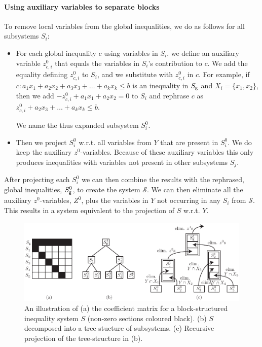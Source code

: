 \paragraph{Using auxiliary variables to separate blocks}  
To remove local variables from the global inequalities, we do as follows for all subsystems $S_i$:
\begin{itemize}\itemsep0em
\item For each global inequality $c$ using variables in $S_i$, we define an auxiliary variable $z^0_{c,i}$ that equals the variables in $S_i$'s contribution to $c$. We add the equality defining $z^0_{c,i}$ to $S_i$, and we substitute with $z^0_{c,i}$ in $c$. For example, if $c: a_1x_1 + a_2x_2 + a_3x_3 + \ldots + a_kx_k \leq b$ is an inequality in $S_{\texttt{g}}$ and $X_i = \{x_1,x_2\}$, then we add $-z^0_{c,i} + a_1x_1 + a_2x_2 = 0$ to $S_i$ and rephrase $c$ as $z^0_{c,i} + a_2x_3 + \ldots + a_kx_k \leq b$. 

We name the thus expanded subsystem $S_i^0$. 
\item Then we project $S_i^0$ w.r.t. all variables from $Y$ that are present in $S_i^0$. We do keep the auxiliary $z^0$-variables. 
Because of these auxiliary variables this only produces inequalities with variables not present in other subsystems $S_j$. 
\end{itemize}
After projecting each $S_i^0$ we can then combine the results with the rephrased, global inequalities, $S_{\texttt{g}}^0$, to create the system $\mathcal{S}$. We can then eliminate all the auxiliary $z^0$-variables, $Z^0$, plus the variables in $Y$ not occurring in any $S_i$ from $\mathcal{S}$. This results in a system equivalent to the projection of $S$ w.r.t. $Y$. %

\begin{figure}
	\centering
		\includegraphics{figures/recursiveProjectionEs.pdf}
	\caption{An illustration of (a) the coefficient matrix for a block-structured inequality system $S$ (non-zero sections coloured black). (b) $S$ decomposed into a tree stucture of subsystems. (c) Recursive projection of the tree-structure in (b).}
	\label{fig:decomp}
\end{figure}


